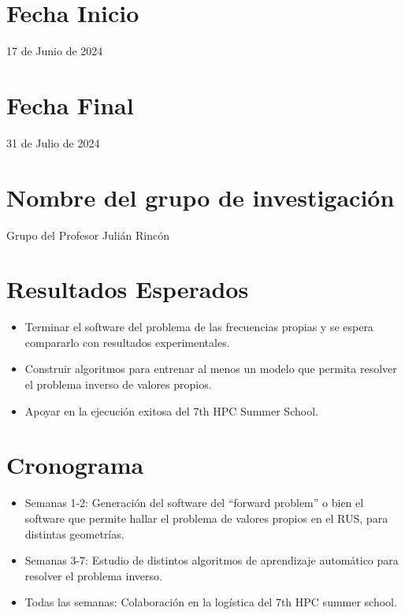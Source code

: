 \documentclass[12pt]{article}
\begin{document}
\section{Fecha Inicio}
17 de Junio de 2024
\section{Fecha Final}
31 de Julio de 2024

\section{Nombre del grupo de investigación}
Grupo del Profesor Julián Rincón

\section{Resultados Esperados}
\begin{itemize}
    \item Terminar el software del problema de las frecuencias propias y se espera compararlo con resultados experimentales. 
    \item Construir algoritmos para entrenar al menos un modelo que permita resolver el problema inverso de valores propios. 
    \item Apoyar en la ejecución exitosa del 7th HPC Summer School.
\end{itemize}


\section{Cronograma}
\begin{itemize}
    \item Semanas 1-2: Generación del software del ``forward problem'' o bien el software que permite hallar el problema de valores propios en el RUS, para distintas geometrías.
    \item Semanas 3-7: Estudio de distintos algoritmos de aprendizaje automático para resolver el problema inverso.
    \item Todas las semanas: Colaboración en la logística del 7th HPC summer school.
\end{itemize}








\vspace{1.5cm}
\end{document}
